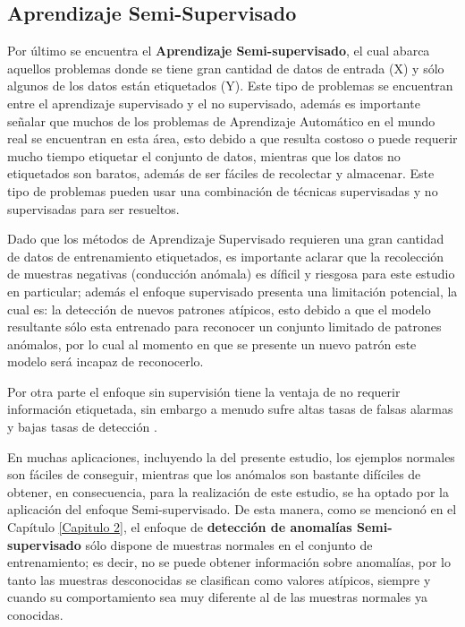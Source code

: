 \subsection{Aprendizaje Semi-Supervisado}

Por \'{u}ltimo se encuentra el \textbf{Aprendizaje Semi-supervisado}, el cual abarca aquellos problemas donde se tiene gran cantidad de datos de entrada (X) y s\'{o}lo algunos de los datos est\'{a}n etiquetados (Y). Este tipo de problemas se encuentran entre el aprendizaje supervisado y el no supervisado, adem\'{a}s es importante se\~{n}alar que muchos de los problemas de Aprendizaje Autom\'{a}tico en el mundo real se encuentran en esta \'{a}rea, esto debido a que resulta costoso o puede requerir mucho tiempo etiquetar el conjunto de datos, mientras que los datos no etiquetados son baratos, adem\'{a}s de ser f\'{a}ciles de recolectar y almacenar. Este tipo de problemas pueden usar una combinaci\'{o}n de t\'{e}cnicas supervisadas y no supervisadas para ser resueltos.

\vspace{5mm} %

Dado que los m\'{e}todos de Aprendizaje Supervisado requieren una gran cantidad de datos de entrenamiento etiquetados, es importante aclarar que la recolecci\'{o}n de muestras negativas (conducci\'{o}n an\'{o}mala) es d\'{i}ficil y riesgosa para este estudio en particular; adem\'{a}s el enfoque supervisado presenta una limitaci\'{o}n potencial, la cual es: la detecci\'{o}n de nuevos patrones at\'{i}picos, esto debido a que el modelo resultante s\'{o}lo esta entrenado para reconocer un conjunto limitado de patrones an\'{o}malos, por lo cual al momento en que se presente un nuevo patr\'{o}n este modelo ser\'{a} incapaz de reconocerlo.

\vspace{5mm} %

Por otra parte el enfoque sin supervisi\'{o}n tiene la ventaja de no requerir informaci\'{o}n etiquetada, sin embargo a menudo sufre altas tasas de falsas alarmas y bajas tasas de detecci\'{o}n \cite{Reference33}. 

\vspace{5mm} %

En muchas aplicaciones, incluyendo la del presente estudio, los ejemplos normales son f\'{a}ciles de conseguir, mientras que los an\'{o}malos son bastante dif\'{i}ciles de obtener, en consecuencia, para la realizaci\'{o}n de este estudio, se ha optado por la aplicaci\'{o}n del enfoque Semi-supervisado. De esta manera, como se mencion\'{o} en el Cap\'{i}tulo \ref{Capitulo 2}, el enfoque de \textbf{detecci\'{o}n de anomal\'{i}as Semi-supervisado} s\'{o}lo dispone de muestras normales en el conjunto de entrenamiento; es decir, no se puede obtener informaci\'{o}n sobre anomal\'{i}as, por lo tanto las muestras desconocidas se clasifican como valores at\'{i}picos, siempre y cuando su comportamiento sea muy diferente al de las muestras normales ya conocidas.

